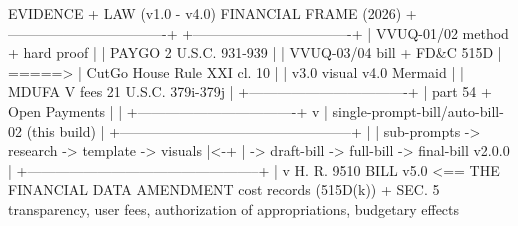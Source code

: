 \documentclass[11pt]{article}
\begin{document}
\begin{asciifig}
EVIDENCE + LAW (v1.0 - v4.0)                 FINANCIAL FRAME (2026)
+----------------------------------+         +----------------------------------+
| VVUQ-01/02  method + hard proof  |         | PAYGO 2 U.S.C. 931-939           |
| VVUQ-03/04  bill + FD&C 515D     |  =====> | CutGo House Rule XXI cl. 10      |
| v3.0 visual  v4.0 Mermaid        |         | MDUFA V fees 21 U.S.C. 379i-379j |
+----------------------------------+         | part 54 + Open Payments          |
                 |                           +----------------------------------+
                 v                                            |
        single-prompt-bill/auto-bill-02  (this build)         |
        +--------------------------------------------------+  |
        | sub-prompts -> research -> template -> visuals   |<-+
        | -> draft-bill -> full-bill -> final-bill v2.0.0  |
        +--------------------------------------------------+
                 |
                 v
        H. R. 9510 BILL v5.0  <== THE FINANCIAL DATA AMENDMENT
        cost records (515D(k)) + SEC. 5 transparency, user fees,
        authorization of appropriations, budgetary effects
\end{asciifig}
\vspace{-0.4cm}

\clearpage
{}

\label{toc:s1}


\end{document}

